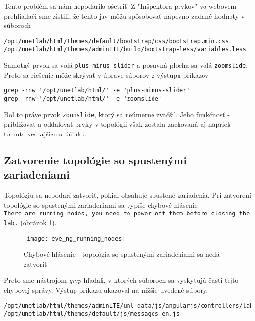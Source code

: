 Tento problém sa nám nepodarilo ošetriť. Z "Inšpektora prvkov" vo webovom prehliadači sme zistili, že tento jav môžu spôsobovať napevno zadané hodnoty v súboroch
\begin{verbatim}
/opt/unetlab/html/themes/default/bootstrap/css/bootstrap.min.css
/opt/unetlab/html/themes/adminLTE/build/bootstrap-less/variables.less
\end{verbatim}

Samotný prvok sa volá \texttt{plus-minus-slider} a posuvná plocha sa volá \texttt{zoomslide}, Preto sa riešenie môže skrývať v úprave súborov z výstupu príkazov
\begin{verbatim}
grep -rnw '/opt/unetlab/html/' -e 'plus-minus-slider'
grep -rnw '/opt/unetlab/html/' -e 'zoomslide'
\end{verbatim}

Bol to práve prvok \texttt{zoomslide}, ktorý sa neúmerne zväčšil. Jeho funkčnosť - približovať a oddaľovať prvky v topológii však zostala zachovaná aj napriek tomuto vedľajšiemu účinku.




\subsection{Zatvorenie topológie so spustenými zariadeniami}

Topológiu sa nepodarí zatvoriť, pokiaľ obsahuje spustené zariadenia. Pri zatvorení topológie so spustenými zariadeniami sa vypíše chybové hlásenie \\
\texttt{There are running nodes, you need to power off them before closing the lab.} (obrázok \ref{obr:eve_ng_running_nodes}). \\

\begin{figure}
    \centering
    \texttt{[image: eve\_ng\_running\_nodes]}
    \caption{Chybové hlásenie - topológia so spustenými zariadeniami sa nedá zatvoriť}
    \label{obr:eve_ng_running_nodes}
\end{figure}

Preto sme nástrojom \emph{grep} hľadali, v ktorých súboroch sa vyskytujú časti tejto chybovej správy. Výstup príkazu ukazoval na nižšie uvedené súbory. \\
\begin{verbatim}
/opt/unetlab/html/themes/adminLTE/unl_data/js/angularjs/controllers/lab/labCtrl.js
/opt/unetlab/html/themes/default/js/messages_en.js
\end{verbatim}


